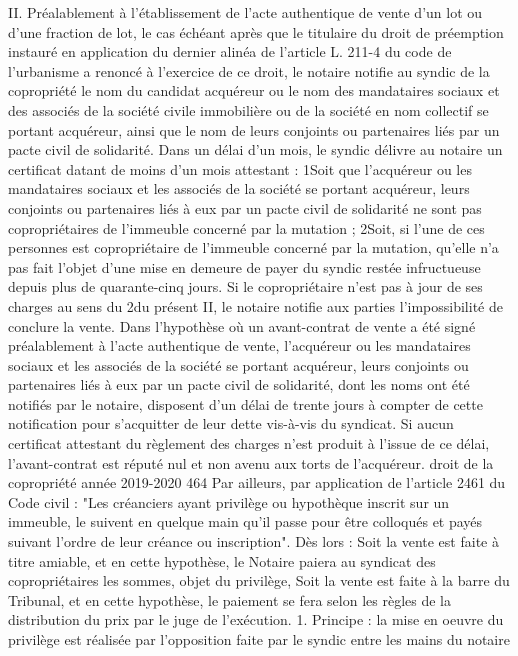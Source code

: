 II. Préalablement à l'établissement de l'acte authentique de vente d'un lot ou d'une fraction de lot, le cas échéant après que le titulaire du droit de préemption instauré en application du dernier alinéa de l'article L. 211-4 du code de l'urbanisme a renoncé à l'exercice de ce droit, le notaire notifie au syndic de la copropriété le nom du candidat acquéreur ou le nom des mandataires sociaux et des associés de la société civile immobilière ou de la société en nom collectif se portant acquéreur, ainsi que le nom de leurs conjoints ou partenaires liés par un pacte civil de solidarité. Dans un délai d'un mois, le syndic délivre au notaire un certificat datant de moins d'un mois attestant : 1\degres Soit que l'acquéreur ou les mandataires sociaux et les associés de la société se portant acquéreur, leurs conjoints ou partenaires liés à eux par un pacte civil de solidarité ne sont pas copropriétaires de l'immeuble concerné par la mutation ; 2\degres Soit, si l'une de ces personnes est copropriétaire de l'immeuble concerné par la mutation, qu'elle n'a pas fait l'objet d'une mise en demeure de payer du syndic restée infructueuse depuis plus de quarante-cinq jours. Si le copropriétaire n'est pas à jour de ses charges au sens du 2\degres du présent II, le notaire notifie aux parties l'impossibilité de conclure la vente. Dans l'hypothèse où un avant-contrat de vente a été signé préalablement à l'acte authentique de vente, l'acquéreur ou les mandataires sociaux et les associés de la société se portant acquéreur, leurs conjoints ou partenaires liés à eux par un pacte civil de solidarité, dont les noms ont été notifiés par le notaire, disposent d'un délai de trente jours à compter de cette notification pour s'acquitter de leur dette vis-à-vis du syndicat. Si aucun certificat attestant du règlement des charges n'est produit à l'issue de ce délai, l'avant-contrat est réputé nul et non avenu aux torts de l'acquéreur.
droit de la copropriété année 2019-2020
464
Par ailleurs, par application de l'article 2461 du Code civil :
"Les créanciers ayant privilège ou hypothèque inscrit sur un immeuble, le suivent en quelque main qu'il passe pour être colloqués et payés suivant l'ordre de leur créance ou inscription".
Dès lors :
Soit la vente est faite à titre amiable, et en cette hypothèse, le Notaire paiera au syndicat des copropriétaires les sommes, objet du privilège,
Soit la vente est faite à la barre du Tribunal, et en cette hypothèse, le paiement se fera selon les règles de la distribution du prix par le juge de l’exécution.
1. Principe : la mise en oeuvre du privilège est réalisée par l’opposition faite par le syndic entre les mains du notaire
